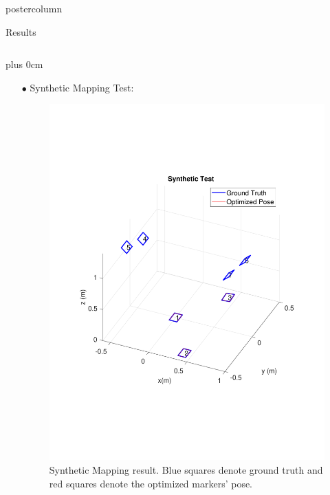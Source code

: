 \documentclass{beamer}
\renewcommand{\raggedright}{\leftskip=0pt \rightskip=0pt plus 0cm}
\begin{document}
\begin{frame}
\begin{columns}
\begin{column}{.57\textwidth}
\begin{beamercolorbox}[center]{postercolumn}
\begin{minipage}{.98\textwidth}
{\begin{myblock}{Results}
\begin{minipage}[0.3\textheight]{\textwidth}
\begin{columns}[T]
\begin{column}{0.33\textwidth}
\raggedright
\begin{enumerate}[label=,labelindent=\parindent,leftmargin=*]
\item[$\bullet$] Synthetic Mapping Test: 
\begin{figure}
\centering
\includegraphics[width=1.0\textwidth]{img/synthetic_3d_new}
\caption{Synthetic Mapping result. Blue squares denote ground truth and red squares denote the optimized markers' pose.}
\label{fig:synthetic_3d}
\end{figure}
\begin{figure}
\centering

\end{figure}
\end{enumerate}
\end{column}
\end{columns}
\end{minipage}
\end{myblock}}
\end{minipage}
\end{beamercolorbox}
\end{column}
\end{columns}
\end{frame}
\end{document}
